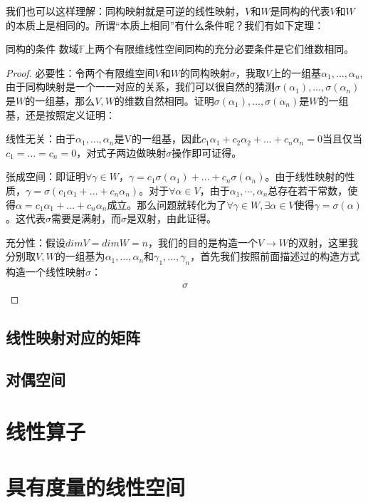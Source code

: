         我们也可以这样理解：同构映射就是可逆的线性映射，$V$和$W$是同构的代表$V$和$W$的本质上是相同的。所谓“本质上相同”有什么条件呢？我们有如下定理：
        \begin{theorem}{同构的条件}
            数域$\mathbb{F}$上两个有限维线性空间同构的充分必要条件是它们维数相同。
        \end{theorem}
        \begin{proof}
             必要性：令两个有限维空间$V$和$W$的同构映射$\sigma$，我取$V$上的一组基$\alpha_1,\dots,\alpha_n$,由于同构映射是一个一一对应的关系，我们可以很自然的猜测$\sigma(\alpha_1),\dots,\sigma(\alpha_n)$是$W$的一组基，那么$V,W$的维数自然相同。证明$\sigma(\alpha_1),\dots,\sigma(\alpha_n)$是$W$的一组基，还是按照定义证明：
             
             线性无关：由于$\alpha_1,\dots,\alpha_n$是V的一组基，因此$c_1\alpha_1+c_2\alpha_2+\dots+c_n\alpha_n=0$当且仅当$c_1=\dots=c_n=0$，对式子两边做映射$\sigma$操作即可证得。
             
             张成空间：即证明$\forall\gamma\in W$，$\gamma=c_1\sigma(\alpha_1)+\dots+c_n\sigma(\alpha_n)$。由于线性映射的性质，$\gamma=\sigma(c_1\alpha_1+\dots+c_n\alpha_n)$。对于$\forall \alpha\in V$，由于$\alpha_1,\cdots,\alpha_n$总存在若干常数，使得$\alpha=c_1\alpha_1+\dots+c_n\alpha_n$成立。那么问题就转化为了$\forall\gamma\in W,\exists \alpha\in V$使得$\gamma=\sigma(\alpha)$。这代表$\sigma$需要是满射，而$\sigma$是双射，由此证得。
             
             充分性：假设$dimV=dimW=n$，我们的目的是构造一个$V\rightarrow W$的双射，这里我分别取$V,W$的一组基为$\alpha_1,\dots,\alpha_n$和$\gamma_1,\dots,\gamma_n$，首先我们按照前面描述过的构造方式构造一个线性映射$\sigma$：
             \begin{align}
                 \begin{split}
                     \sigma
                 \end{split}
             \end{align}

        \end{proof}
    \subsection{线性映射对应的矩阵}
    
    \subsection{对偶空间}
    
\section{线性算子}

\section{具有度量的线性空间}

